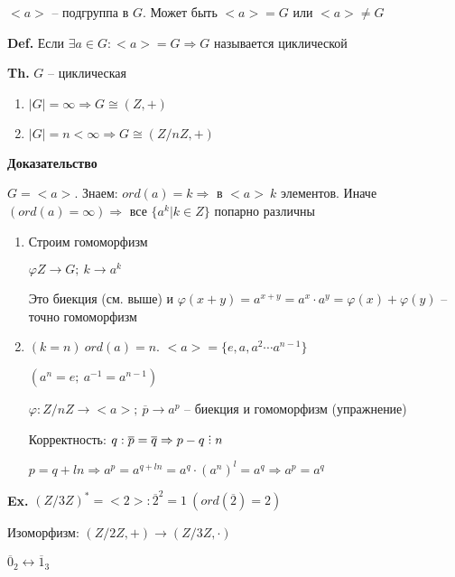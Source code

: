 \documentclass[14pt, letter paper]{article}
\DeclareRobustCommand{\divby}{%
  \mathrel{\text{\vbox{\baselineskip.65ex\lineskiplimit0pt\hbox{.}\hbox{.}\hbox{.}}}}%
}
\begin{document}
\vspace{5mm}

$<a>$ -- подгруппа в $G$. Может быть $<a> = G$ или $<a> \neq G$

\textbf{Def.} Если $\exists a \in G : <a> = G \Rightarrow G$ называется циклической

\textbf{Th.} $G$ -- циклическая

\begin{enumerate}
    \item $|G| = \infty \Rightarrow G \cong (Z, +)$

    \item $|G| = n < \infty \Rightarrow G \cong (Z/nZ, +)$
\end{enumerate}

\begin{center}
    \textbf{Доказательство}
\end{center}

$G = <a>$. Знаем: $ord(a) = k \Rightarrow$ в $<a>\ k$ элементов. Иначе $(ord(a) = \infty) \Rightarrow$ все $\{a^k| k \in Z\}$ попарно различны

\begin{enumerate}
    \item Строим гомоморфизм

    $\varphi Z \rightarrow G;\ k \rightarrow a^k$

    Это биекция (см. выше) и $\varphi(x + y) = a^{x + y} = a^x \cdot a^y = \varphi(x) + \varphi(y)$ -- точно гомоморфизм

    \item $(k = n)\ ord(a) = n$. $<a> = \{ e, a, a^2 \cdots a^{n-1}\}$

    $(a^n = e;\ a^{-1} = a^{n-1})$

    $\varphi : Z/nZ \rightarrow <a>;\ \overline{p} \rightarrow a^p$ -- биекция и гомоморфизм (упражнение)

    Корректность: $q : \overline{p} = \overline{q} \Rightarrow p - q \divby n$

    $p = q + ln \Rightarrow a^p = a^{q + ln} = a^q \cdot (a^n)^l = a^q \Rightarrow a^p = a^q$
\end{enumerate}

\vspace{5mm}

\textbf{Ex.} $(Z/3Z)^* = <2> : \overline{2}^2 = 1\ (ord(\overline{2}) = 2)$

Изоморфизм: $(Z/2Z, +) \rightarrow (Z/3Z, \cdot)$

$\overline{0}_2 \leftrightarrow \overline{1}_3$
\end{document}
